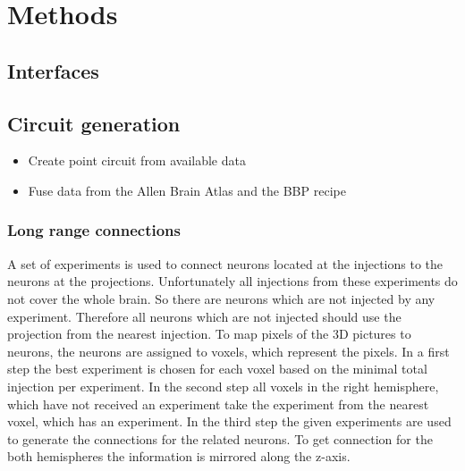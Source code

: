 \documentclass[a4paper]{article}
\begin{document}
\section{Methods}
\subsection{Interfaces}
\subsection{Circuit generation}
\begin{itemize}
      \item Create point circuit from available data
      \item Fuse data from the Allen Brain Atlas and the BBP recipe
   \end{itemize}

\subsubsection{Long range connections}
A set of experiments is used to connect neurons located at the injections
to the neurons at the projections. Unfortunately all injections from these experiments do not
cover the whole brain. So there are neurons which are not injected
by any experiment. Therefore all neurons which are not injected should use the projection
from the nearest injection. To map pixels of the 3D pictures to neurons, the neurons are assigned to voxels, which represent the pixels. In a first step the best experiment is chosen for each voxel based on the minimal total injection per experiment. In the second step all voxels in the right hemisphere, which have not received an experiment take the experiment from the nearest voxel, which has an experiment. In the third step the given experiments are used to generate the connections for the related neurons. To get connection for the both hemispheres the information is mirrored along the z-axis.
\end{document}
